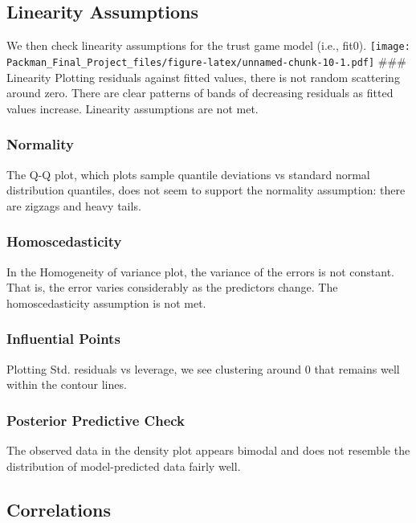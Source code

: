 \documentclass[
  doc,draftall]{apa6}
\begin{document}
\subsection{Linearity Assumptions}\label{linearity-assumptions-1}

We then check linearity assumptions for the trust game model (i.e., fit0).
\texttt{[image: Packman\_Final\_Project\_files/figure-latex/unnamed-chunk-10-1.pdf]}
\#\#\# Linearity
Plotting residuals against fitted values, there is not random scattering around zero. There are clear patterns of bands of decreasing residuals as fitted values increase. Linearity assumptions are not met.

\subsubsection{Normality}\label{normality}

The Q-Q plot, which plots sample quantile deviations vs standard normal distribution quantiles, does not seem to support the normality assumption: there are zigzags and heavy tails.

\subsubsection{Homoscedasticity}\label{homoscedasticity}

In the Homogeneity of variance plot, the variance of the errors is not constant. That is, the error varies considerably as the predictors change. The homoscedasticity assumption is not met.

\subsubsection{Influential Points}\label{influential-points-1}

Plotting Std. residuals vs leverage, we see clustering around 0 that remains well within the contour lines.

\subsubsection{Posterior Predictive Check}\label{posterior-predictive-check-1}

The observed data in the density plot appears bimodal and does not resemble the distribution of model-predicted data fairly well.

\subsection{Correlations}\label{correlations}
\end{document}
